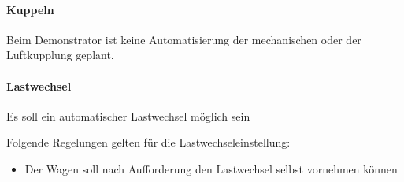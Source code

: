 \paragraph{Kuppeln}
Beim Demonstrator ist keine Automatisierung der mechanischen oder der Luftkupplung geplant.

\paragraph{Lastwechsel}
\begin{feat}
Es soll ein automatischer Lastwechsel möglich sein
\end{feat}
\begin{rem}
Folgende Regelungen gelten für die Lastwechseleinstellung:
\begin{itemize}
    \item Der Wagen soll nach Aufforderung den Lastwechsel selbst vornehmen können
\end{itemize}
\end{rem}

